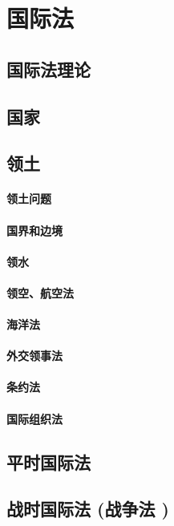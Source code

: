\documentclass[UTF8]{../ApplicationUniverse}
\begin{document}
\chapter{国际法}
\section{国际法理论}
\section{国家}
\section{领土}
    \subsubsection{领土问题}
    \subsubsection{国界和边境}
    \subsubsection{领水}
    \subsubsection{领空、航空法}
    \subsubsection{海洋法}
    \subsubsection{外交领事法}
    \subsubsection{条约法}
    \subsubsection{国际组织法}

\section{平时国际法}
\section{战时国际法 (战争法 )}
\end{document}
